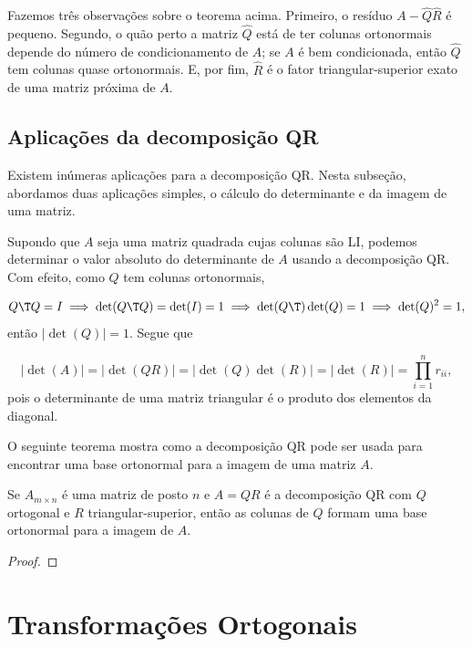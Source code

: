 \documentclass{article}
\begin{document}
Fazemos três observações sobre o teorema acima. Primeiro, o resíduo \(A - \hat{Q} \hat{R}\) é pequeno. Segundo, o quão perto a matriz \(\hat{Q}\) está de ter colunas ortonormais depende do número de condicionamento de \(A\); se \(A\) é bem condicionada, então \(\hat{Q}\) tem colunas quase ortonormais. E, por fim, \(\hat{R}\) é o fator triangular-superior exato de uma matriz próxima de \(A\).

\subsection{Aplicações da decomposição QR}

Existem inúmeras aplicações para a decomposição QR. Nesta subseção, abordamos duas aplicações simples, o cálculo do determinante e da imagem de uma matriz.

Supondo que \(A\) seja uma matriz quadrada cujas colunas são LI, podemos determinar o valor absoluto do determinante de \(A\) usando a decomposição QR. Com efeito, como \(Q\) tem colunas ortonormais,

\begin{equation*}
    Q\T Q = I \implies \det(Q\T Q) = \det(I) = 1 \implies \det(Q\T )\det(Q) = 1 \implies \det(Q)^2 = 1,
\end{equation*}
então \(\vert \det(Q) \vert = 1\). Segue que

\begin{equation*}
    \vert \det(A) \vert = \vert \det(QR) \vert = \vert \det(Q) \det(R) \vert = \vert \det(R) \vert = \prod_{i=1}^n r_{ii},
\end{equation*}
pois o determinante de uma matriz triangular é o produto dos elementos da diagonal.

O seguinte teorema mostra como a decomposição QR pode ser usada para encontrar uma base ortonormal para a imagem de uma matriz \(A\).

\begin{thm}
    Se \(A_{m \times n}\) é uma matriz de posto \(n\) e \(A = QR\) é a decomposição QR com \(Q\) ortogonal e \(R\) triangular-superior, então as colunas de \(Q\) formam uma base ortonormal para a imagem de \(A\).
\end{thm}

\begin{proof}
    
\end{proof}

\section{Transformações Ortogonais}
\end{document}
